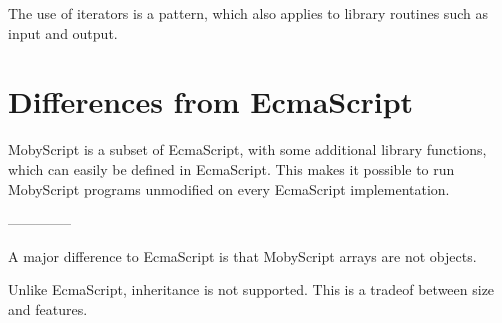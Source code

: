 The use of iterators is a pattern, which also applies to library routines such as input and output.


\section{Differences from EcmaScript}

MobyScript is a subset of EcmaScript, with some additional library functions, which can easily be defined in EcmaScript. This makes it possible to run MobyScript programs unmodified on every EcmaScript implementation.

--------------

A major difference to EcmaScript is that MobyScript arrays are not objects.

Unlike EcmaScript, inheritance is not supported. This is a tradeof between size and features.
